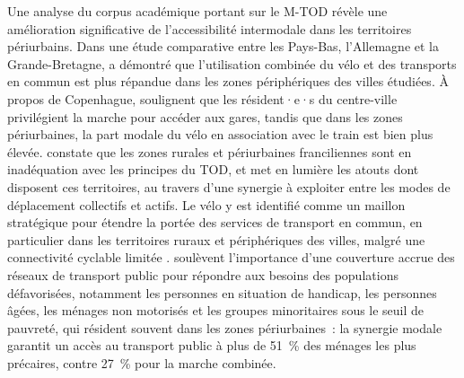 \begin{refsegment}
Une analyse du corpus académique portant sur le \acrshort{M-TOD} révèle une amélioration significative de l'accessibilité intermodale dans les territoires périurbains. Dans une étude comparative entre les Pays-Bas, l'Allemagne et la Grande-Bretagne, \textcolor{blue}{\textcite[291]{martens_bicycle_2004}} a démontré que l'utilisation combinée du vélo et des transports en commun est plus répandue dans les zones périphériques des villes étudiées. À propos de Copenhague, \textcolor{blue}{\textcite[25]{halldorsdottir_home-end_2017}} soulignent que les résident·e·s du centre-ville privilégient la marche pour accéder aux gares, tandis que dans les zones périurbaines, la part modale du vélo en association avec le train est bien plus élevée. \textcolor{blue}{\textcite[38]{stransky_periurbain_2019}} constate que les zones rurales et périurbaines franciliennes sont en inadéquation avec les principes du TOD, et met en lumière les atouts dont disposent ces territoires, au travers d'une synergie à exploiter entre les modes de déplacement collectifs et actifs. Le vélo y est identifié comme un maillon stratégique pour étendre la portée des services de transport en commun, en particulier dans les territoires ruraux et périphériques des villes, malgré une connectivité cyclable limitée \textcolor{blue}{\autocite[86]{zuo_incorporating_2021}}. \textcolor{blue}{\textcite[10]{zuo_determining_2018}} soulèvent l'importance d'une couverture accrue des réseaux de transport public pour répondre aux besoins des populations défavorisées, notamment les personnes en situation de handicap, les personnes âgées, les ménages non motorisés et les groupes minoritaires sous le seuil de pauvreté, qui résident souvent dans les zones périurbaines~: la synergie modale garantit un accès au transport public à plus de 51~\% des ménages les plus précaires, contre 27~\% pour la marche combinée.%


\end{refsegment}
